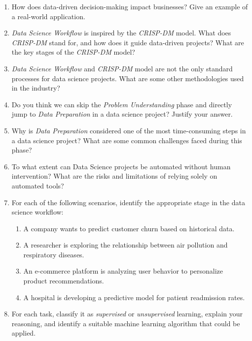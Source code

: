 \documentclass[
]{book}
\providecommand{\tightlist}{%
  \setlength{\itemsep}{0pt}\setlength{\parskip}{0pt}}
\theoremstyle{definition}
\theoremstyle{definition}
\theoremstyle{definition}
\theoremstyle{definition}
\theoremstyle{remark}
\begin{document}
\begin{enumerate}
\def\labelenumi{\arabic{enumi}.}
\tightlist
\item
  How does data-driven decision-making impact businesses? Give an example of a real-world application.\\
\item
  \emph{Data Science Workflow} is inspired by the \emph{CRISP-DM} model. What does \emph{CRISP-DM} stand for, and how does it guide data-driven projects? What are the key stages of the \emph{CRISP-DM} model?\\
\item
  \emph{Data Science Workflow} and \emph{CRISP-DM} model are not the only standard processes for data science projects. What are some other methodologies used in the industry?\\
\item
  Do you think we can skip the \emph{Problem Understanding} phase and directly jump to \emph{Data Preparation} in a data science project? Justify your answer.\\
\item
  Why is \emph{Data Preparation} considered one of the most time-consuming steps in a data science project? What are some common challenges faced during this phase?\\
\item
  To what extent can Data Science projects be automated without human intervention? What are the risks and limitations of relying solely on automated tools?\\
\item
  For each of the following scenarios, identify the appropriate stage in the data science workflow:

  \begin{enumerate}
  \def\labelenumii{\alph{enumii}.}
  \tightlist
  \item
    A company wants to predict customer churn based on historical data.\\
  \item
    A researcher is exploring the relationship between air pollution and respiratory diseases.\\
  \item
    An e-commerce platform is analyzing user behavior to personalize product recommendations.\\
  \item
    A hospital is developing a predictive model for patient readmission rates.\\
  \end{enumerate}
\item
  For each task, classify it as \emph{supervised} or \emph{unsupervised} learning, explain your reasoning, and identify a suitable machine learning algorithm that could be applied.


\end{enumerate}
\end{document}
